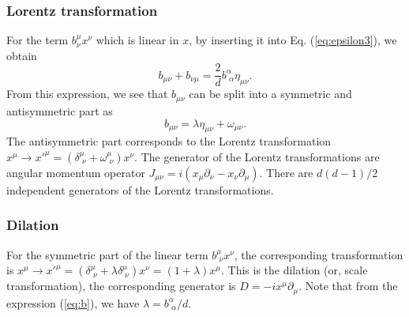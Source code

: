 \documentclass[graybox,envcountchap,sectrefs]{svmono}
\begin{document}
\subsubsection*{Lorentz transformation}
For the term $b^{\mu}_{\nu}x^{\nu}$ which is linear in $x$,  by inserting it into Eq. (\ref{eq:epsilon3}), we obtain
\begin{equation}\label{eq:b}
b_{\mu\nu}+b_{\nu\mu}=\frac{2}{d}b_{\,\,\alpha}^{\alpha}\eta_{\mu\nu}.
\end{equation}
From this expression, we see that $b_{\mu\nu}$ can be split into a symmetric and antisymmetric part as
$$b_{\mu\nu}=\lambda \eta_{\mu\nu}+\omega_{\mu\nu}.$$
The antisymmetric part corresponds to the Lorentz transformation $x^{\mu}\to x'^{\mu}=(\delta^{\mu}_{\,\,\nu}+\omega^{\mu}_{\,\,\nu})x^{\nu}$. The generator of the Lorentz transformations are angular momentum operator $J_{\mu\nu}=i(x_{\mu}\partial_{\nu}-x_{\nu}\partial_{\mu})$. There are $d(d-1)/2$ independent generators of the Lorentz transformations.

\subsubsection*{Dilation}
For the symmetric part of the linear term $b^{\mu}_{\,\,\nu}x^{\nu}$,  the corresponding transformation is $x^{\mu}\to x'^{\mu}= (\delta_{\,\,\nu}^{\mu}+\lambda\delta_{\,\,\nu}^{\mu})x^{\nu}=(1+\lambda)x^{\mu}$. This is the dilation (or, scale transformation), the corresponding generator is $D=-ix^{\mu}\partial_{\mu}$.  Note that from the expression (\ref{eq:b}), we have $\lambda=b_{\,\,\alpha}^{\alpha}/d$.
\end{document}
